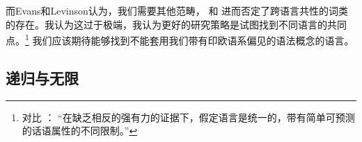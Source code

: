而Evans和Levinson认为，我们需要其他范畴， \citet[]{Haspelmath2009a}和 \citet[]{Croft2009a}进而否定了跨语言共性的词类的存在。我认为这过于极端，我认为更好的研究策略是试图找到不同语言的共同点。\footnote{%
对比 ：
“在缺乏相反的强有力的证据下，假定语言是统一的，带有简单可预测的话语属性的不同限制。”
} 
我们应该期待能够找到不能套用我们带有印欧语系偏见的语法概念的语言。

\subsection{递归与无限}
\label{Abschnitt-Rekursion}

